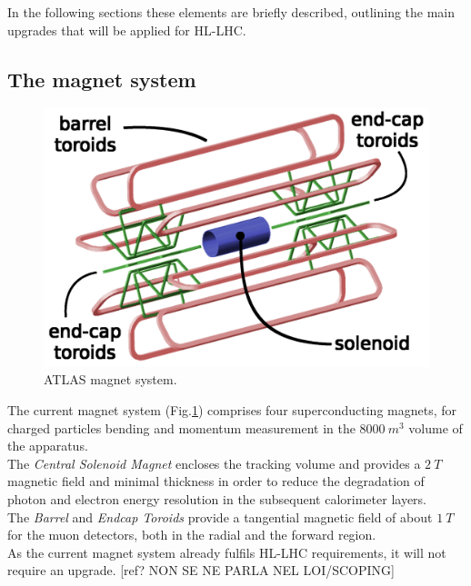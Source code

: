 \documentclass[a4paper,twoside,12pt]{article}
\begin{document}
In the following sections these elements are briefly described, outlining the main upgrades that will be applied for HL-LHC. 

\subsection{The magnet system}\label{sec:magnet}

\begin{figure} [h]
	\includegraphics[width=\textwidth]{magnetSystems}
	\caption{ATLAS magnet system\cite{magnet_system_picture}.}
	\label{fig:magnet_system_picture}
\end{figure}

The current magnet system (Fig.\ref{fig:magnet_system_picture}) comprises four superconducting magnets\cite{magnet_system}, for charged particles bending and momentum measurement in the $8000\ m^3$ volume of the apparatus.\\

The \textit{Central Solenoid Magnet} encloses the tracking volume and provides a $2\ T$ magnetic field and minimal thickness in order to reduce the degradation of photon and electron energy resolution in the subsequent calorimeter layers.\\

The \textit{Barrel} and \textit{Endcap Toroids} provide a tangential magnetic field of about $1\ T$ for the muon detectors, both in the radial and the forward region.\\

As the current magnet system already fulfils HL-LHC requirements, it will not require an
upgrade. [ref? NON SE NE PARLA NEL LOI/SCOPING]
\end{document}
